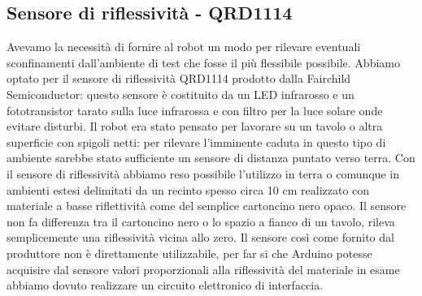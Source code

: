 \subsection{Sensore di riflessività - QRD1114}
Avevamo la necessità di fornire al robot un modo per rilevare eventuali 
sconfinamenti dall'ambiente di test che fosse il più flessibile possibile. 
Abbiamo optato per il sensore di riflessività QRD1114 prodotto dalla Fairchild 
Semiconductor: questo sensore è costituito da un LED infrarosso e un 
fototransistor tarato sulla luce infrarossa e con filtro per la luce solare 
onde evitare disturbi. Il robot era stato pensato per lavorare su un tavolo o 
altra superficie con spigoli netti: per rilevare l'imminente caduta in questo 
tipo di ambiente sarebbe stato sufficiente un sensore di distanza puntato 
verso terra. Con il sensore di riflessività abbiamo reso possibile l'utilizzo 
in terra o comunque in ambienti estesi delimitati da un recinto spesso circa 
10 cm realizzato con materiale a basse riflettività come del semplice 
cartoncino nero opaco. Il sensore non fa differenza tra il cartoncino nero o 
lo spazio a fianco di un tavolo, rileva semplicemente una riflessività vicina 
allo zero. Il sensore così come fornito dal produttore non è direttamente 
utilizzabile, per far si che Arduino potesse acquisire dal sensore valori 
proporzionali alla riflessività del materiale in esame abbiamo dovuto 
realizzare un circuito elettronico di interfaccia. 
